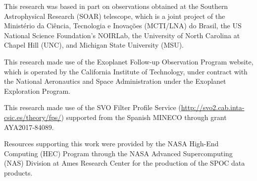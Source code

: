 \documentclass[12pt,twocolumn,tighten]{aastex63}
\begin{document}
This research was based in part on observations obtained at the
Southern Astrophysical Research (SOAR) telescope, which is a joint
project of the Minist\'{e}rio da Ci\^{e}ncia, Tecnologia e
Inova\c{c}\~{o}es (MCTI/LNA) do Brasil, the US National Science
Foundation’s NOIRLab, the University of North Carolina at Chapel Hill
(UNC), and Michigan State University (MSU).

This research made use of the Exoplanet Follow-up Observation
Program website, which is operated by the California Institute of
Technology, under contract with the National Aeronautics and Space
Administration under the Exoplanet Exploration Program.

This research made use of the SVO Filter Profile Service
(\url{http://svo2.cab.inta-csic.es/theory/fps/}) supported from the Spanish
MINECO through grant AYA2017-84089.

Resources supporting this work were provided by the NASA High-End
Computing (HEC) Program through the NASA Advanced Supercomputing (NAS)
Division at Ames Research Center for the production of the SPOC data
products.
%
\end{document}
